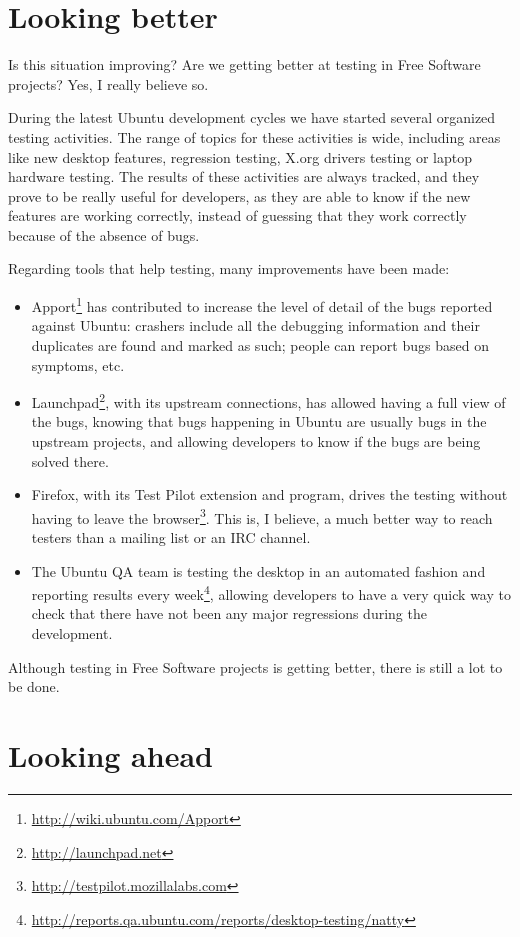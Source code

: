 \section*{Looking better}

Is this situation improving? Are we getting better at testing in Free Software projects?
Yes, I really believe so.

During the latest Ubuntu development cycles we have started several organized
testing activities. The range of topics for these activities is wide, including
areas like new desktop features, regression testing, X.org drivers testing or
laptop hardware testing. The results of these activities are always tracked, and
they prove to be really useful for developers, as they are able to know if the
new features are working correctly, instead of guessing that they work correctly
because of the absence of bugs.

Regarding tools that help testing, many improvements have been made:
\begin{itemize}
 \item Apport\footnote{\url{http://wiki.ubuntu.com/Apport}} has contributed to
increase the level of detail of the bugs reported against Ubuntu: crashers
include all the debugging information and their duplicates are found and marked
as such; people can report bugs based on symptoms, etc.
 \item Launchpad\footnote{\url{http://launchpad.net}}, with its upstream
connections, has allowed having a full view of the bugs, knowing that bugs
happening in Ubuntu are usually bugs in the upstream projects, and allowing
developers to know if the bugs are being solved there. 
 \item Firefox, with its Test Pilot extension and program, drives the testing
without having to leave the
browser\footnote{\url{http://testpilot.mozillalabs.com}}. This is, I believe, a
much better way to reach testers than a mailing list or an IRC channel.
 \item The Ubuntu QA team is testing the desktop in an automated fashion and
reporting results every
week\footnote{\url{http://reports.qa.ubuntu.com/reports/desktop-testing/natty}},
allowing developers to have a very quick way to check that there have not been
any major regressions during the development.
\end{itemize}

Although testing in Free Software projects is getting better, there is still a lot to be
done.

\section*{Looking ahead}

